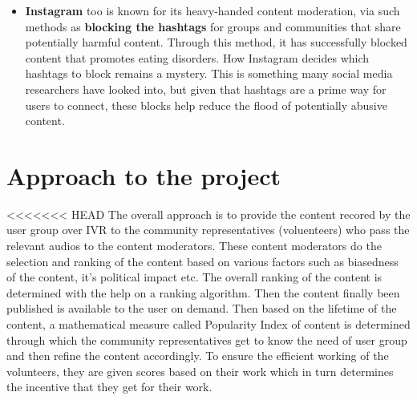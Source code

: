 \documentclass[11pt]{article}
\begin{document}
\begin{itemize}
        \item \textbf{Instagram} too is known for its heavy-handed content moderation, via such methods as \textbf{blocking the hashtags} for groups and communities that share potentially harmful content. Through this method, it has successfully blocked content that promotes eating disorders. How Instagram decides which hashtags to block remains a mystery. This is something many social media researchers have looked into, but given that hashtags are a prime way for users to connect, these blocks help reduce the flood of potentially abusive content.
        
    \end{itemize}


\section{Approach to the project}
<<<<<<< HEAD
    The overall approach is to provide the content recored by the user group over IVR to the community representatives (voluenteers) who pass the relevant audios to the content moderators. These content moderators do the selection and ranking of the content based on various factors such as biasedness of the content, it's political impact etc. The overall ranking of the content is determined with the help on a ranking algorithm. Then the content finally been published is available to the user on demand. Then based on the lifetime of the content, a mathematical measure called Popularity Index of content is determined through which the community representatives get to know the need of user group and then refine the content accordingly. To ensure the efficient working of the volunteers, they are given scores based on their work which in turn determines the incentive that they get for their work.
\end{document}
